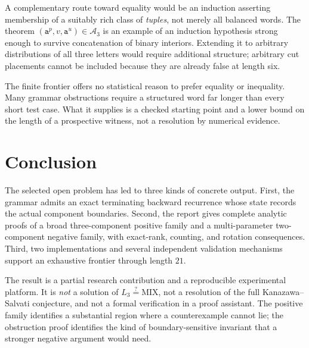 \documentclass[11pt,letterpaper]{article}
\numberwithin{equation}{section}
\theoremstyle{definition}
\theoremstyle{remark}
\newcommand{\A}{\mathcal A}
\newcommand{\Mix}{\mathrm{MIX}}
\renewcommand{\aa}{\mathtt a}
\begin{document}
A complementary route toward equality would be an induction asserting
membership of a suitably rich class of \emph{tuples}, not merely all
balanced words. The theorem \((\aa^p,v,\aa^u)\in\A_3\) is an example
of an induction hypothesis strong enough to survive concatenation
of binary interiors. Extending it to arbitrary distributions of all
three letters would require additional structure; arbitrary cut
placements cannot be included because they are already false at
length six.

The finite frontier offers no statistical reason to prefer equality
or inequality. Many grammar obstructions require a structured word
far longer than every short test case. What it supplies is a checked
starting point and a lower bound on the length of a prospective
witness, not a resolution by numerical evidence.

\section{Conclusion}
The selected open problem has led to three kinds of concrete output.
First, the grammar admits an exact terminating backward recurrence
whose state records the actual component boundaries. Second, the
report gives complete analytic proofs of a broad three-component
positive family and a multi-parameter two-component negative family,
with exact-rank, counting, and rotation consequences. Third, two
implementations and several independent validation mechanisms
support an exhaustive frontier through length \(21\).

The result is a partial research contribution and a reproducible
experimental platform. It is \emph{not} a solution of
\(L_3\stackrel{?}{=}\Mix\), not a resolution of the full
Kanazawa--Salvati conjecture, and not a formal verification in a
proof assistant. The positive family identifies a substantial region
where a counterexample cannot lie; the obstruction proof identifies
the kind of boundary-sensitive invariant that a stronger negative
argument would need.

\appendix
\end{document}

